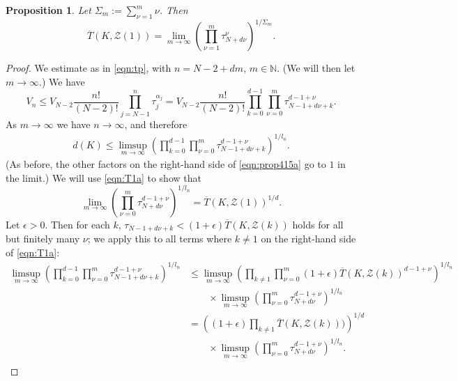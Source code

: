 \documentclass[12pt]{article}
\numberwithin{equation}{section}
\newtheorem{proposition}[theorem]{Proposition}
\newcommand{\N}{\mathbb{N}}
\newcommand{\calZ}{\mathcal{Z}}
\begin{document}
\begin{proposition} \label{prop:13}
Let $\Sigma_m:=\sum_{\nu=1}^m \nu$.  Then
\begin{equation}\label{eqn:TZ1}
\overline T(K,\calZ(1)) = \lim_{m\to\infty} \left(\prod_{\nu=1}^m \tau_{N+d\nu}^{\nu}\right)^{1/\Sigma_m} .
\end{equation}
\end{proposition}

\begin{proof}
We estimate as in \eqref{eqn:tp}, with $n=N-2 +dm$, $m\in\N$. (We will then let $m\to\infty$.)  We have 
\begin{equation}\label{eqn:prop415a}
V_n \leq V_{N-2}\frac{n!}{(N-2)!}\prod_{j=N-1}^n \tau_j^{\alpha_j}  = V_{N-2}\frac{n!}{(N-2)!} \prod_{k=0}^{d-1}\prod_{\nu=0}^m \tau_{N-1+d\nu+k}^{d-1+\nu}.
\end{equation}
 As $m\to\infty$ we have  $n\to\infty$, and therefore 
\begin{equation}\label{eqn:T1a}
\begin{aligned}
d(K)  \leq   \limsup_{m\to\infty}\left(\prod_{k=0}^{d-1}\prod_{\nu=0}^m \tau_{N-1+d\nu+k}^{d-1+\nu} \right)^{1/l_n}. 
\end{aligned}\end{equation}
(As before, the other factors on the right-hand side of \eqref{eqn:prop415a} go to $1$ in the limit.)  We will use \eqref{eqn:T1a} to show that
\begin{equation}\label{eqn:T1b}
\lim_{m\to\infty}\left(\prod_{\nu=0}^m \tau_{N+d\nu}^{d-1+\nu}\right)^{1/l_n} = \overline T(K,\calZ(1))^{1/d}.
\end{equation}
Let $\epsilon>0$.  Then for each $k$, $\tau_{N-1+d\nu+k}<(1+\epsilon)\overline T(K,\calZ(k))$ holds for all but finitely many $\nu$; we apply this to all terms where $k\neq 1$ on the right-hand side of \eqref{eqn:T1a}: 
$$\begin{aligned}
\limsup_{m\to\infty}\left(\prod_{k=0}^{d-1}\prod_{\nu=0}^m \tau_{N-1+d\nu+k}^{d-1+\nu} \right)^{1/l_n}
  & \leq \limsup_{m\to\infty}\left(\prod_{k\neq 1}\prod_{\nu=0}^m (1+\epsilon)\overline T(K,\calZ(k))^{d-1+\nu} \right)^{1/l_n} \\
& \qquad \times \limsup_{m\to\infty}\left(\prod_{\nu=0}^m \tau_{N+d\nu}^{d-1+\nu} \right)^{1/l_n} \\
& = \left((1+\epsilon)\prod_{k\neq 1} \overline T(K,\calZ(k)))\right)^{1/d} \\
&\qquad \times \limsup_{m\to\infty}\left(\prod_{\nu=0}^m \tau_{N+d\nu}^{d-1+\nu} \right)^{1/l_n}. \\

\end{aligned}$$
\end{proof}
\end{document}
